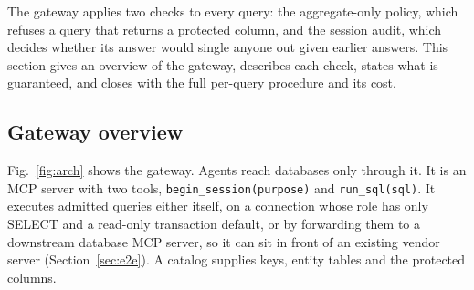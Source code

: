 \documentclass[sigconf,nonacm]{acmart}
\begin{document}
The gateway applies two checks to every query: the aggregate-only policy, which refuses a query that returns a protected column, and the session audit, which decides whether its answer would single anyone out given earlier answers. This section gives an overview of the gateway, describes each check, states what is guaranteed, and closes with the full per-query procedure and its cost.

\subsection{Gateway overview}\label{sec:arch}
Fig.~\ref{fig:arch} shows the gateway. Agents reach databases only through it. It is an MCP server with two tools, \texttt{begin\_session(purpose)} and \texttt{run\_sql(sql)}. It executes admitted queries either itself, on a connection whose role has only SELECT and a read-only transaction default, or by forwarding them to a downstream database MCP server, so it can sit in front of an existing vendor server (Section~\ref{sec:e2e}). A catalog supplies keys, entity tables and the protected columns.
\end{document}
